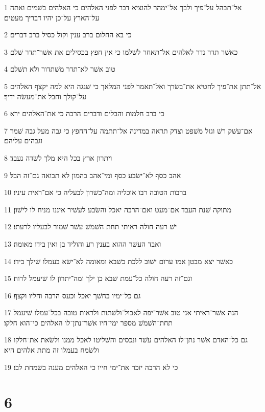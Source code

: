 \par 1 אל־תבהל על־פיך ולבך אל־ימהר להוציא דבר לפני האלהים כי האלהים בשׁמים ואתה על־הארץ על־כן יהיו דבריך מעטים׃
\par 2 כי בא החלום ברב ענין וקול כסיל ברב דברים׃
\par 3 כאשׁר תדר נדר לאלהים אל־תאחר לשׁלמו כי אין חפץ בכסילים את אשׁר־תדר שׁלם׃
\par 4 טוב אשׁר לא־תדר משׁתדור ולא תשׁלם׃
\par 5 אל־תתן את־פיך לחטיא את־בשׂרך ואל־תאמר לפני המלאך כי שׁגגה היא למה יקצף האלהים על־קולך וחבל את־מעשׂה ידיך׃
\par 6 כי ברב חלמות והבלים ודברים הרבה כי את־האלהים ירא׃
\par 7 אם־עשׁק רשׁ וגזל משׁפט וצדק תראה במדינה אל־תתמה על־החפץ כי גבה מעל גבה שׁמר וגבהים עליהם׃
\par 8 ויתרון ארץ בכל היא מלך לשׂדה נעבד׃
\par 9 אהב כסף לא־ישׂבע כסף ומי־אהב בהמון לא תבואה גם־זה הבל׃
\par 10 ברבות הטובה רבו אוכליה ומה־כשׁרון לבעליה כי אם־ראית עיניו׃
\par 11 מתוקה שׁנת העבד אם־מעט ואם־הרבה יאכל והשׂבע לעשׁיר איננו מניח לו לישׁון׃
\par 12 ישׁ רעה חולה ראיתי תחת השׁמשׁ עשׁר שׁמור לבעליו לרעתו׃
\par 13 ואבד העשׁר ההוא בענין רע והוליד בן ואין בידו מאומה׃
\par 14 כאשׁר יצא מבטן אמו ערום ישׁוב ללכת כשׁבא ומאומה לא־ישׂא בעמלו שׁילך בידו׃
\par 15 וגם־זה רעה חולה כל־עמת שׁבא כן ילך ומה־יתרון לו שׁיעמל לרוח׃
\par 16 גם כל־ימיו בחשׁך יאכל וכעס הרבה וחליו וקצף׃
\par 17 הנה אשׁר־ראיתי אני טוב אשׁר־יפה לאכול־ולשׁתות ולראות טובה בכל־עמלו שׁיעמל תחת־השׁמשׁ מספר ימי־חיו אשׁר־נתן־לו האלהים כי־הוא חלקו׃
\par 18 גם כל־האדם אשׁר נתן־לו האלהים עשׁר ונכסים והשׁליטו לאכל ממנו ולשׂאת את־חלקו ולשׂמח בעמלו זה מתת אלהים היא׃
\par 19 כי לא הרבה יזכר את־ימי חייו כי האלהים מענה בשׂמחת לבו׃

\chapter{6}

